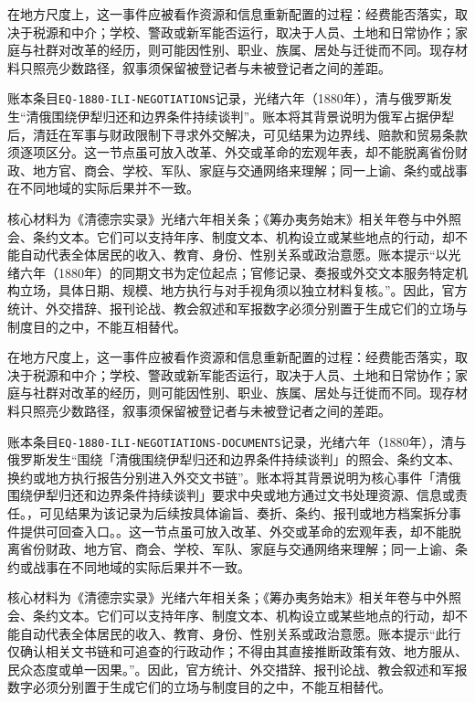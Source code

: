 在地方尺度上，这一事件应被看作资源和信息重新配置的过程：经费能否落实，取决于税源和中介；学校、警政或新军能否运行，取决于人员、土地和日常协作；家庭与社群对改革的经历，则可能因性别、职业、族属、居处与迁徙而不同。现存材料只照亮少数路径，叙事须保留被登记者与未被登记者之间的差距。

账本条目\texttt{EQ-1880-ILI-NEGOTIATIONS}记录，光绪六年（1880年），清与俄罗斯发生“清俄围绕伊犁归还和边界条件持续谈判”。账本将其背景说明为俄军占据伊犁后，清廷在军事与财政限制下寻求外交解决，可见结果为边界线、赔款和贸易条款须逐项区分。这一节点虽可放入改革、外交或革命的宏观年表，却不能脱离省份财政、地方官、商会、学校、军队、家庭与交通网络来理解；同一上谕、条约或战事在不同地域的实际后果并不一致。

核心材料为《清德宗实录》光绪六年相关条；《筹办夷务始末》相关年卷与中外照会、条约文本。它们可以支持年序、制度文本、机构设立或某些地点的行动，却不能自动代表全体居民的收入、教育、身份、性别关系或政治意愿。账本提示“以光绪六年（1880年）的同期文书为定位起点；官修记录、奏报或外交文本服务特定机构立场，具体日期、规模、地方执行与对手视角须以独立材料复核。”。因此，官方统计、外交措辞、报刊论战、教会叙述和军报数字必须分别置于生成它们的立场与制度目的之中，不能互相替代。

在地方尺度上，这一事件应被看作资源和信息重新配置的过程：经费能否落实，取决于税源和中介；学校、警政或新军能否运行，取决于人员、土地和日常协作；家庭与社群对改革的经历，则可能因性别、职业、族属、居处与迁徙而不同。现存材料只照亮少数路径，叙事须保留被登记者与未被登记者之间的差距。

账本条目\texttt{EQ-1880-ILI-NEGOTIATIONS-DOCUMENTS}记录，光绪六年（1880年），清与俄罗斯发生“围绕「清俄围绕伊犁归还和边界条件持续谈判」的照会、条约文本、换约或地方执行报告分别进入外交文书链”。账本将其背景说明为核心事件「清俄围绕伊犁归还和边界条件持续谈判」要求中央或地方通过文书处理资源、信息或责任。，可见结果为该记录为后续按具体谕旨、奏折、条约、报刊或地方档案拆分事件提供可回查入口。。这一节点虽可放入改革、外交或革命的宏观年表，却不能脱离省份财政、地方官、商会、学校、军队、家庭与交通网络来理解；同一上谕、条约或战事在不同地域的实际后果并不一致。

核心材料为《清德宗实录》光绪六年相关条；《筹办夷务始末》相关年卷与中外照会、条约文本。它们可以支持年序、制度文本、机构设立或某些地点的行动，却不能自动代表全体居民的收入、教育、身份、性别关系或政治意愿。账本提示“此行仅确认相关文书链和可追查的行政动作；不得由其直接推断政策有效、地方服从、民众态度或单一因果。”。因此，官方统计、外交措辞、报刊论战、教会叙述和军报数字必须分别置于生成它们的立场与制度目的之中，不能互相替代。

